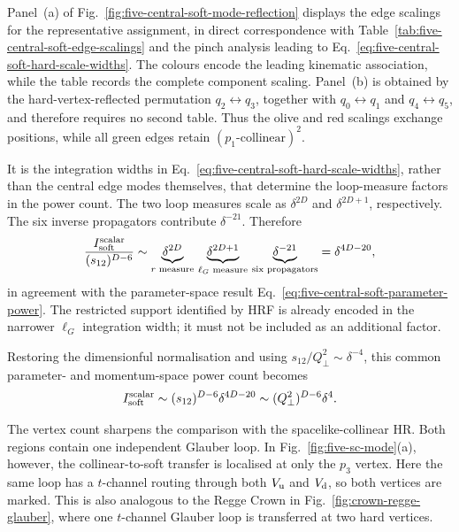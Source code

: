 \documentclass[a4paper,11pt]{article}
\begin{document}
Panel~(a) of Fig.~\ref{fig:five-central-soft-mode-reflection} displays the
edge scalings for the representative assignment, in direct correspondence
with Table~\ref{tab:five-central-soft-edge-scalings} and the pinch analysis
leading to Eq.~\eqref{eq:five-central-soft-hard-scale-widths}.  The colours
encode the leading kinematic association, while the table records the
complete component scaling.  Panel~(b) is obtained by the hard-vertex-reflected
permutation \(q_2\leftrightarrow q_3\), together with
\(q_0\leftrightarrow q_1\) and \(q_4\leftrightarrow q_5\), and therefore
requires no second table.  Thus the olive and red scalings exchange
positions, while all green edges retain
\((p_1\text{-collinear})^2\).
\fi

It is the integration widths in
Eq.~\eqref{eq:five-central-soft-hard-scale-widths}, rather than the central
edge modes themselves, that determine the loop-measure factors in the power
count.  The two loop measures scale as
\(\delta^{2D}\) and \(\delta^{2D+1}\), respectively.  The six inverse
propagators contribute \(\delta^{-21}\).  Therefore
\begin{equation}
 \frac{I_{\rm soft}^{\rm scalar}}{(s_{12})^{D-6}}
 \sim
 \underbrace{\delta^{2D}}_{r\text{ measure}}\,
 \underbrace{\delta^{2D+1}}_{\ell_G\text{ measure}}\,
 \underbrace{\delta^{-21}}_{\text{six propagators}}
 =\delta^{4D-20},
 \label{eq:five-central-soft-power}
\end{equation}
in agreement with the parameter-space result
Eq.~\eqref{eq:five-central-soft-parameter-power}.  The restricted support
identified by HRF is already encoded in the narrower \(\ell_G\) integration
width; it must not be included as an additional factor.

Restoring the dimensionful normalisation and using
\(s_{12}/Q_\perp^2\sim\delta^{-4}\), this common parameter- and
momentum-space power count becomes
\begin{equation}
 I_{\rm soft}^{\rm scalar}
 \sim (s_{12})^{D-6}\delta^{4D-20}
 \sim (Q_\perp^2)^{D-6}\delta^4.
 \label{eq:five-central-soft-dimensionful-power}
\end{equation}

\iffalse
The vertex count sharpens the comparison with the spacelike-collinear HR.
Both regions contain one independent Glauber loop.  In
Fig.~\ref{fig:five-sc-mode}(a), however, the collinear-to-soft transfer is
localised at only the \(p_3\) vertex.  Here the same loop has a
\(t\)-channel routing through both \(V_{\rm u}\) and \(V_{\rm d}\), so both
vertices are marked.  This is also analogous to the Regge Crown in
Fig.~\ref{fig:crown-regge-glauber}, where one \(t\)-channel Glauber loop is
transferred at two hard vertices.
\end{document}
